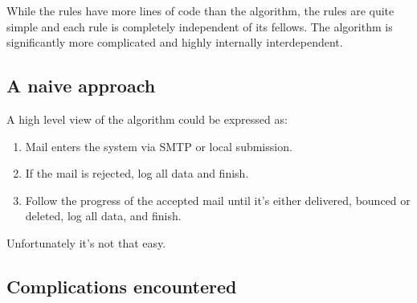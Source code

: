 \documentclass[a4paper,12pt,draft]{article}
\begin{document}
\label{parsing-algorithm}

While the rules have more lines of code than the algorithm, the rules are
quite simple and each rule is completely independent of its fellows.  The
algorithm is significantly more complicated and highly internally
interdependent.


\subsection{A naive approach}

A high level view of the algorithm could be expressed as:

\begin{enumerate}

    \item Mail enters the system via SMTP or local submission.

    \item If the mail is rejected, log all data and finish.

    \item Follow the progress of the accepted mail until it's either
        delivered, bounced or deleted, log all data, and finish.

\end{enumerate}

Unfortunately it's not that easy.


\subsection{Complications encountered}

\label{complications}
\end{document}
